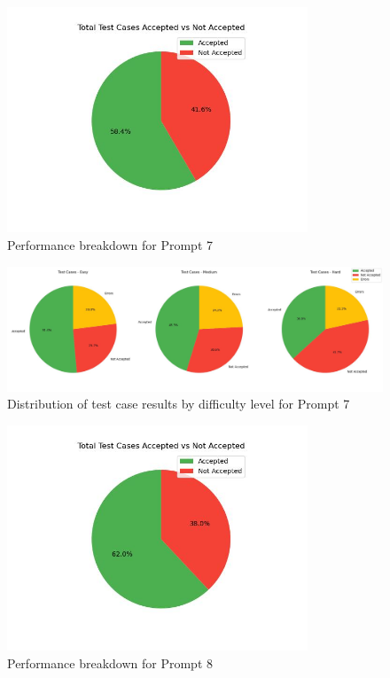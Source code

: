 \begin{figure}[H]
    \centering
    \includegraphics[width=0.8\textwidth]{figures/7/total_accepted_not.jpg}
    \caption{Performance breakdown for Prompt 7}
    \label{fig:prompt7_performance}
\end{figure}

\begin{figure}[H]
    \centering
    \includegraphics[width=1\textwidth]{figures/7/pie_difficulty.jpg}
    \caption{Distribution of test case results by difficulty level for Prompt 7}
    \label{fig:prompt7_difficulty}
\end{figure}

\begin{figure}[H]
    \centering
    \includegraphics[width=0.8\textwidth]{figures/8/total_accepted_not.jpg}
    \caption{Performance breakdown for Prompt 8}
    \label{fig:prompt8_performance}
\end{figure}

